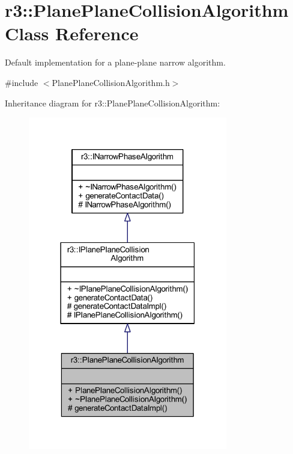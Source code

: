 \hypertarget{classr3_1_1_plane_plane_collision_algorithm}{}\section{r3\+:\+:Plane\+Plane\+Collision\+Algorithm Class Reference}
\label{classr3_1_1_plane_plane_collision_algorithm}


Default implementation for a plane-\/plane narrow algorithm.  




{\ttfamily \#include $<$Plane\+Plane\+Collision\+Algorithm.\+h$>$}



Inheritance diagram for r3\+:\+:Plane\+Plane\+Collision\+Algorithm\+:\nopagebreak
\begin{figure}[H]
\begin{center}
\leavevmode
\includegraphics[width=247pt]{classr3_1_1_plane_plane_collision_algorithm__inherit__graph}
\end{center}
\end{figure}



